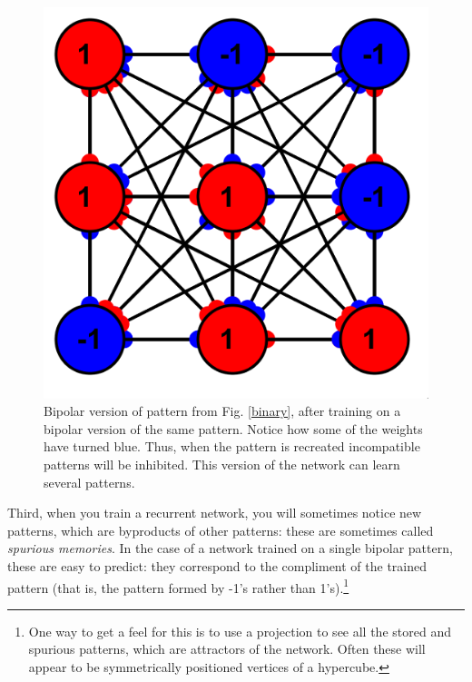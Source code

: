 \begin{figure}[h]
\centering
\includegraphics[scale=.6]{./images/hebb_bipolar_9.png}
\caption[Simbrain screenshot]{Bipolar version of pattern from Fig. \ref{binary}, after training on a bipolar version of the same pattern. Notice how some of the weights have turned blue. Thus, when the pattern is recreated incompatible patterns will be inhibited. This version of the network can learn several patterns.}
\label{bipolar}
\end{figure}

Third, when you train a recurrent network, you will sometimes notice new patterns, which are byproducts of other patterns: these are sometimes called \emph{spurious memories}. In the case of a network trained on a single bipolar pattern, these are easy to predict: they correspond to the compliment of the trained pattern (that is, the pattern formed by -1's rather than 1's).\footnote{One way to get a feel for this is to use a projection to see all the stored and spurious patterns, which are attractors of the network. Often these will appear to be symmetrically positioned vertices of a hypercube.} 


